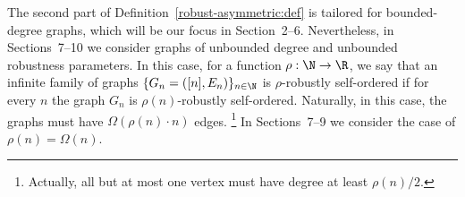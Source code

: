The second part of Definition~\ref{robust-asymmetric:def}
is tailored for bounded-degree graphs, which will be our focus
in Section~2--6.
Nevertheless,
in Sections~7--10
we consider graphs
of unbounded degree and unbounded robustness parameters.
In this case, for a function $\rho:\N\to\R$,
we say that an infinite family of graphs $\{G_n=([n],E_n)\}_{n\in\N}$
is {\sf $\rho$-robustly self-ordered} if for every $n$
the graph $G_n$ is $\rho(n)$-robustly self-ordered.
Naturally, in this case, the graphs
must have $\Omega(\rho(n)\cdot n)$ edges.
\footnote{Actually, all but at most one vertex
must have degree at least $\rho(n)/2$.}
%
In Sections~7--9
we consider the case of $\rho(n)=\Omega(n)$.


























































































